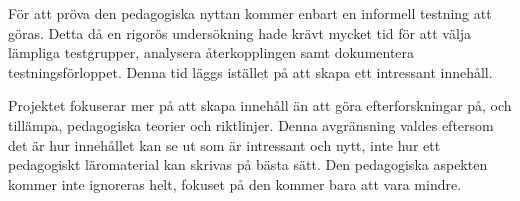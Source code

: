 För att pröva den pedagogiska nyttan kommer enbart en informell testning
att göras. Detta då en rigorös undersökning hade krävt mycket tid för att välja
lämpliga testgrupper, analysera återkopplingen samt dokumentera
testningsförloppet. Denna tid läggs istället på att skapa ett intressant innehåll.

Projektet fokuserar mer på att skapa innehåll än att göra
efterforskningar på, och tillämpa, pedagogiska teorier och riktlinjer. Denna
avgränsning valdes eftersom det är hur innehållet kan se ut som är
intressant och nytt, inte hur ett pedagogiskt läromaterial kan skrivas på bästa sätt. Den
pedagogiska aspekten kommer inte ignoreras helt, fokuset på den kommer bara att
vara mindre.
